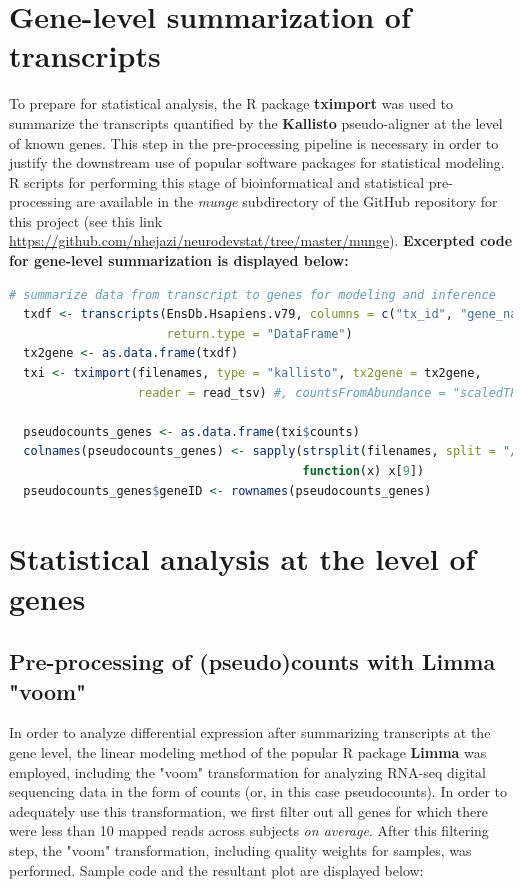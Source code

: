 \documentclass[11pt]{article}
\begin{document}
\section{Gene-level summarization of transcripts}
To prepare for statistical analysis, the R package \textbf{tximport} was used
to summarize the transcripts quantified by the \textbf{Kallisto} pseudo-aligner
at the level of known genes. This step in the pre-processing pipeline is
necessary in order to justify the downstream use of popular software packages
for statistical modeling. R scripts for performing this stage of
bioinformatical and statistical pre-processing are available in the
\textit{munge} subdirectory of the GitHub repository for this project (see this
link \url{https://github.com/nhejazi/neurodevstat/tree/master/munge}).
\textbf{Excerpted code for gene-level summarization is displayed below:}

\begin{lstlisting}[language=R]
  # summarize data from transcript to genes for modeling and inference
  txdf <- transcripts(EnsDb.Hsapiens.v79, columns = c("tx_id", "gene_name"),
                      return.type = "DataFrame")
  tx2gene <- as.data.frame(txdf)
  txi <- tximport(filenames, type = "kallisto", tx2gene = tx2gene,
                  reader = read_tsv) #, countsFromAbundance = "scaledTPM")

  pseudocounts_genes <- as.data.frame(txi$counts)
  colnames(pseudocounts_genes) <- sapply(strsplit(filenames, split = "/"),
                                         function(x) x[9])
  pseudocounts_genes$geneID <- rownames(pseudocounts_genes)
\end{lstlisting}


\section{Statistical analysis at the level of genes}

\subsection{Pre-processing of (pseudo)counts with Limma "voom"}
In order to analyze differential expression after summarizing transcripts at the
gene level, the linear modeling method of the popular R package \textbf{Limma}
was employed, including the "voom" transformation for analyzing RNA-seq digital
sequencing data in the form of counts (or, in this case pseudocounts). In order
to adequately use this transformation, we first filter out all genes for which
there were less than 10 mapped reads across subjects \textit{on average}. After
this filtering step, the "voom" transformation, including quality weights for
samples, was performed. Sample code and the resultant plot are displayed below:
\end{document}
